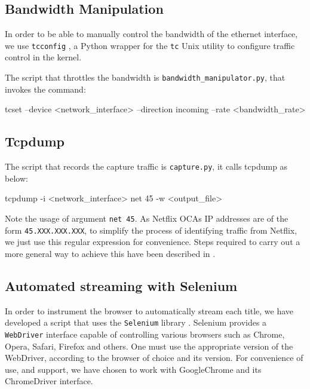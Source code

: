 \newpage
\subsection{Bandwidth Manipulation}

In order to be able to manually control the bandwidth of the ethernet
interface, we use \texttt{tcconfig} \cite{tcconfig}, a Python wrapper for the
\texttt{tc} \cite{tc} Unix utility to configure traffic control in the kernel.

The script that throttles the bandwidth is \texttt{bandwidth\_manipulator.py},
that invokes the command:

\begin{bash_script}[caption={Enforce a bandwidth rate on the specified interface}, label={tcconfig}]
tcset --device <network_interface> --direction incoming --rate <bandwidth_rate>
\end{bash_script}

\subsection{Tcpdump}

The script that records the capture traffic is \texttt{capture.py}, it calls
tcpdump as below:

\begin{bash_script}[caption={Listens for TCP/IP traffic on the specified
    interface}, label={tcpdump}]
tcpdump -i <network_interface> net 45 -w <output_file>
\end{bash_script}

Note the usage of argument \texttt{net 45}. As Netflix OCAs IP addresses are of
the form \texttt{45.XXX.XXX.XXX}, to simplify the process of identifying
traffic from Netflix, we just use this regular expression for convenience.
Steps required to carry out a more general way to achieve this have been
described in .

\subsection{Automated streaming with Selenium}

In order to instrument the browser to automatically stream each title, we have
developed a script that uses the \texttt{Selenium} library \cite{selenium}.
Selenium provides a \texttt{WebDriver} interface capable of controlling various
browsers such as Chrome, Opera, Safari, Firefox and others. One must use the
appropriate version of the WebDriver, according to the browser of choice and
its version. For convenience of use, and support, we have chosen to work with
GoogleChrome and its ChromeDriver interface.

